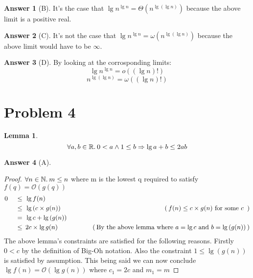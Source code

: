 \documentclass{article}
\newtheorem{lemma}{Lemma}
\theoremstyle{definition}
\newtheorem*{answer}{Answer}
\newcommand{\evidence}[1]{\ensuremath{\hspace{3em} (\hspace{0.2em} \text{#1} \hspace{0.2em})}}
\newcommand{\asymptotic}[3]{\ensuremath{#2 = #1(#3)}}
\newcommand{\bigO}[2]{\asymptotic{\mathcal{O}}{#1}{#2}}
\newcommand{\littleO}[2]{\asymptotic{o}{#1}{#2}}
\newcommand{\littleOmega}[2]{\asymptotic{\omega}{#1}{#2}}
\newcommand{\bigTheta}[2]{\asymptotic{\Theta}{#1}{#2}}
\newcommand{\relation}[1]{\ensuremath{\hspace{0.2em} {{} #1 {}} \hspace{0.2em}}}
\newcommand{\equal}{\relation{=}}
\newcommand{\lesseq}{\relation{\le}}
\newcommand{\parens}[1]{\left(#1\right)}
\newcommand{\lglg}[1]{\ensuremath{\lg{\parens{\lg{#1}}}}}
\newcommand{\quantify}[2]{\ensuremath{\forall #1 \in \mathbb{#2}. \hspace{0.2em}}}
\begin{document}
\vspace{0.5em}

\begin{answer}[B]
  It's the case that $\bigTheta{\lg{n}^{\lg{n}}}{n^{\lglg{n}}}$
  because the above limit is a positive real.
\end{answer}

\vspace{0.5em}

\begin{answer}[C]
  It's not the case that $\littleOmega{\lg{n}^{\lg{n}}}{n^{\lglg{n}}}$
  because the above limit would have to be $\infty$.
\end{answer}

\begin{answer}[D]
  By looking at the corrosponding limits:
  \begin{equation*}
    \littleO{\lg{n}^{\lg{n}}}{\parens{\lg{n}}!}
  \end{equation*}
  \begin{equation*}
    \littleOmega{n^{\lglg{n}}}{\parens{\lg{n}}!}
  \end{equation*}

\end{answer}

\section*{Problem 4}

\begin{lemma}
  \begin{equation*}
    \quantify{a, b}{R} 0 < a \wedge 1 \le b \Rightarrow \lg{a} + b \le 2ab
  \end{equation*}
\end{lemma}

\begin{answer}[A]
  \hfill
  \begin{proof}
    $\quantify{n}{N} m \le n$ where m is the lowest q required to satisfy $\bigO{f(q)}{g(q)}$
    \begin{alignat*}{4}
      & 0  & \lesseq & \lg{f(n)}                   & {} \\
      & {} & \lesseq & \lg{\parens{c \times g(n)}} & \evidence{$f(n) \le  c \times g(n)$ for some $c$ } \\
      & {} & \equal  & \lg{c} + \lg{\parens{g(n)}} & {} \\
      & {} & \lesseq & 2c \times \lg{g(n)}         & \evidence{By the above lemma where $a = \lg{c}$ and $b = \lg{\parens{g(n)}}$}
  \end{alignat*}
  The above lemma's constraints are satisfied for the following reasons.
  Firstly $0 < c$ by the definition of Big-Oh notation.
  Also the constraint $1 \le \lg{\parens{g(n)}}$ is satisfied by assumption. 
  This being said we can now conclude $\bigO{\lg{f(n)}}{\lg{g(n)}}$ where
  $c_1 = 2c$ and $m_1 = m$ \qedhere
  \end{proof}
  
\end{answer}
\end{document}
